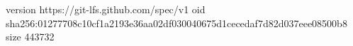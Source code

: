 version https://git-lfs.github.com/spec/v1
oid sha256:01277708c10cf1a2193e36aa02df030040675d1cecedaf7d82d037eee08500b8
size 443732
